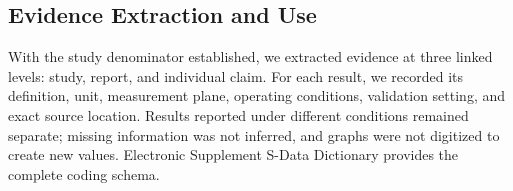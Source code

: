 %
%
%
%
%
%
%
%

\subsection{Evidence Extraction and Use}

With the study denominator established, we extracted evidence at three linked
levels: study, report, and individual claim. For each result, we recorded its
definition, unit, measurement plane, operating conditions, validation setting,
and exact source location. Results reported under different conditions remained
separate; missing information was not inferred, and graphs were not digitized
to create new values. Electronic Supplement S-Data Dictionary provides the
complete coding schema.


